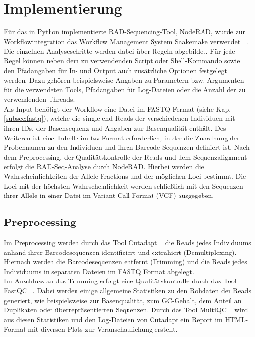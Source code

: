 \chapter{Implementierung} \label{sec:alg}
Für das in Python implementierte RAD-Sequencing-Tool, NodeRAD, wurde zur Workflowintegration das Workflow Management System Snakemake verwendet ~\cite{koester_2012_1, koester_2012_2}. Die einzelnen Analyseschritte werden dabei über Regeln abgebildet. Für jede Regel können neben dem zu verwendenden Script oder Shell-Kommando sowie den Pfadangaben für In- und Output auch zusätzliche Optionen festgelegt werden. Dazu gehören beispielsweise Angaben zu Parametern bzw. Argumenten für die verwendeten Tools, Pfadangaben für Log-Dateien oder die Anzahl der zu verwendenden Threads. \\

Als Input benötigt der Workflow eine Datei im FASTQ-Format (siehe Kap. \ref{subsec:fastq}), welche die single-end Reads der verschiedenen Individuen mit ihren IDs, der Basensequenz und Angaben zur Basenqualität enthält. Des Weiteren ist eine Tabelle im tsv-Format erforderlich, in der die Zuordnung der Probennamen zu den Individuen und ihren Barcode-Sequenzen definiert ist. Nach dem Preprocessing, der Qualitätskontrolle der Reads und dem Sequenzalignment erfolgt die RAD-Seq-Analyse durch NodeRAD. Hierbei werden die Wahrscheinlichkeiten der Allele-Fractions und der möglichen Loci bestimmt. Die Loci mit der höchsten Wahrscheinlichkeit werden schließlich mit den Sequenzen ihrer Allele in einer Datei im Variant Call Format (VCF) ausgegeben.

\section{Preprocessing} \label{sec:preproc}

Im Preprocessing werden durch das Tool Cutadapt ~\cite{martin_2011} die Reads jedes Individuums anhand ihrer Barcodesequenzen identifiziert und extrahiert (Demultiplexing). Hiernach werden die Barcodesequenzen entfernt (Trimming) und die Reads jedes Individuums in separaten Dateien im FASTQ Format abgelegt. \\

Im Anschluss an das Trimming erfolgt eine Qualitätskontrolle durch das Tool FastQC  ~\cite{andrews_2012}. Dabei werden einige allgemeine Statistiken zu den Rohdaten der Reads generiert, wie beispielsweise zur Basenqualität, zum GC-Gehalt, dem Anteil an Duplikaten oder überrepräsentierten Sequenzen. Durch das Tool MultiQC ~\cite{ewels_2016} wird aus diesen Statistiken und den Log-Dateien von Cutadapt ein Report im HTML-Format mit diversen Plots zur Veranschaulichung erstellt.

